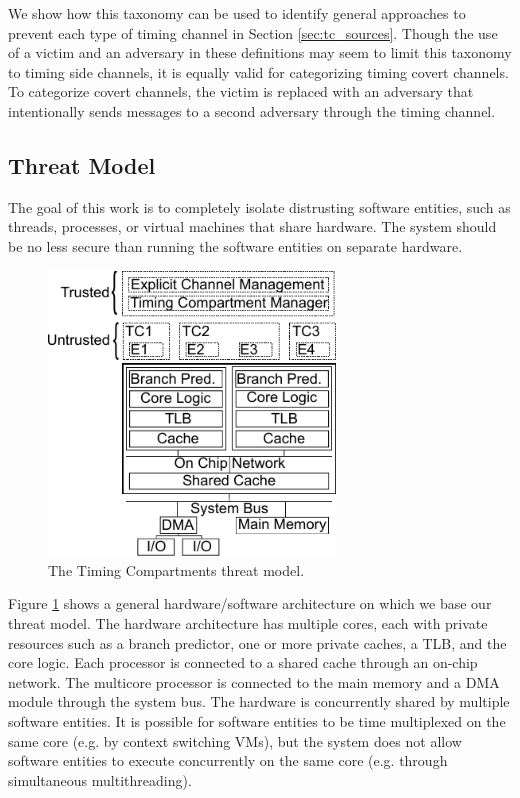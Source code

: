 We show how this taxonomy can be used to identify general approaches to prevent 
each type of timing channel in Section \ref{sec:tc_sources}. Though the use of 
a victim and an adversary in these definitions may seem to limit this taxonomy 
to timing side channels, it is equally valid for categorizing timing covert 
channels. To categorize covert channels, the victim is replaced with an 
adversary that intentionally sends messages to a second adversary through the 
timing channel.

\subsection{Threat Model}
The goal of this work is to completely isolate distrusting software entities, 
such as threads, processes, or virtual machines that share hardware. The system 
should be no less secure than running the software entities on separate 
hardware. 

\begin{figure}
    \begin{center}
        \includegraphics[width=3in]{figs/threat_model.pdf}
        \caption{The Timing Compartments threat model.}
        \label{fig:threat_model}
    \end{center}
\end{figure}

Figure \ref{fig:threat_model} shows a general hardware/software architecture on 
which we base our threat model. The hardware architecture has multiple cores, 
each with private resources such as a branch predictor, one or more private 
caches, a TLB, and the core logic. Each processor is connected to a shared 
cache through an on-chip network. The multicore processor is connected to the 
main memory and a DMA module through the system bus. The hardware is 
concurrently shared by multiple software entities. It is possible for software 
entities to be time multiplexed on the same core (e.g.  by context switching 
VMs), but the system does not allow software entities to execute concurrently 
on the same core (e.g. through simultaneous multithreading). 

